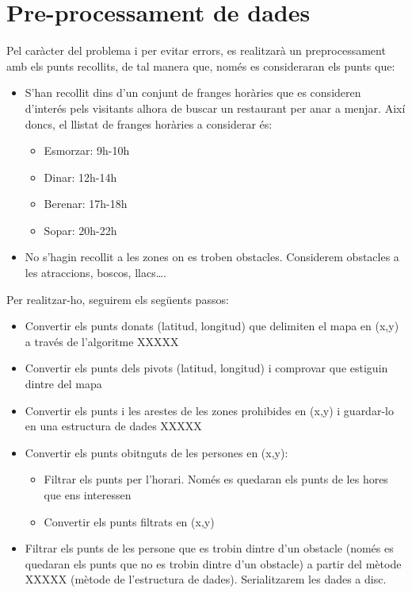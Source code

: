 \documentclass[12pt]{article}
\begin{document}
\section{Pre-processament de dades}
Pel caràcter del problema i per evitar errors, es realitzarà un preprocessament amb els punts recollits, de tal manera que, només es consideraran els punts que:
\begin{itemize}
	\item S’han recollit dins d’un conjunt de franges horàries que es consideren d'interés pels visitants alhora de buscar un restaurant per anar a menjar. 
	Així doncs, el llistat de franges horàries a considerar és:
	\begin{itemize}
		\item Esmorzar: 9h-10h
		\item Dinar: 12h-14h
		\item Berenar: 17h-18h
		\item Sopar: 20h-22h
	\end{itemize}

	\item No s’hagin recollit a les zones on es troben obstacles. 
	Considerem obstacles a les atraccions, boscos, llacs….
\end{itemize}

Per realitzar-ho, seguirem els següents passos:
\begin{itemize}
	\item Convertir els punts donats (latitud, longitud) que delimiten el mapa en (x,y) a través de l'algoritme XXXXX
	\item Convertir els punts dels pivots (latitud, longitud) i comprovar que estiguin dintre del mapa
	\item Convertir els punts i les arestes de les zones prohibides en (x,y) i guardar-lo en una estructura de dades XXXXX
	\item Convertir els punts obitnguts de les persones en (x,y):
	\begin{itemize}
		\item Filtrar els punts per l'horari. Només es quedaran els punts de les hores que ens interessen
		\item Convertir els punts filtrats en (x,y)
	\end{itemize}
	\item Filtrar els punts de les persone que es trobin dintre d'un obstacle (només es quedaran els punts que no es trobin dintre d'un obstacle) a partir del mètode XXXXX (mètode de l'estructura de dades). Serialitzarem les dades a disc.
\end{itemize}
\end{document}
